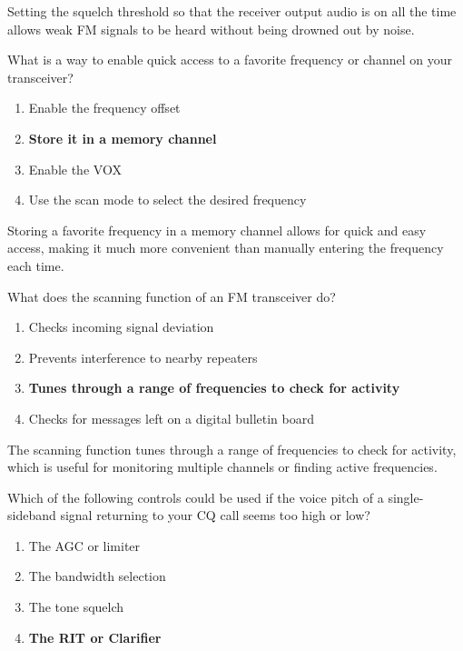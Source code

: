 Setting the squelch threshold so that the receiver output audio is on all the time allows weak FM signals to be heard without being drowned out by noise.

\begin{tcolorbox}[colback=gray!10!white,colframe=black!75!black,title={T4B04}]
    What is a way to enable quick access to a favorite frequency or channel on your transceiver?
    \begin{enumerate}[label=\Alph*),noitemsep]
        \item Enable the frequency offset
        \item \textbf{Store it in a memory channel}
        \item Enable the VOX
        \item Use the scan mode to select the desired frequency
    \end{enumerate}
\end{tcolorbox}

Storing a favorite frequency in a memory channel allows for quick and easy access, making it much more convenient than manually entering the frequency each time.

\begin{tcolorbox}[colback=gray!10!white,colframe=black!75!black,title={T4B05}]
    What does the scanning function of an FM transceiver do?
    \begin{enumerate}[label=\Alph*),noitemsep]
        \item Checks incoming signal deviation
        \item Prevents interference to nearby repeaters
        \item \textbf{Tunes through a range of frequencies to check for activity}
        \item Checks for messages left on a digital bulletin board
    \end{enumerate}
\end{tcolorbox}

The scanning function tunes through a range of frequencies to check for activity, which is useful for monitoring multiple channels or finding active frequencies.

\begin{tcolorbox}[colback=gray!10!white,colframe=black!75!black,title={T4B06}]
    Which of the following controls could be used if the voice pitch of a single-sideband signal returning to your CQ call seems too high or low?
    \begin{enumerate}[label=\Alph*),noitemsep]
        \item The AGC or limiter
        \item The bandwidth selection
        \item The tone squelch
        \item \textbf{The RIT or Clarifier}
    \end{enumerate}
\end{tcolorbox}

